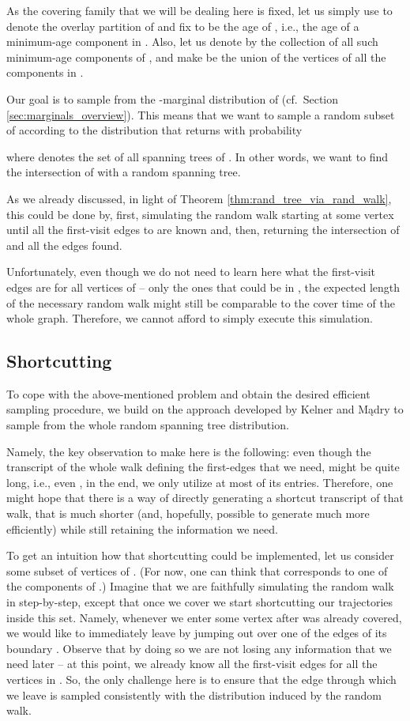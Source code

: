 \documentclass[11pt, letterpaper]{article}
\begin{document}
As the covering family  that we will be dealing here is fixed, let us simply use  to denote the overlay partition  of  and fix  to be the age of , i.e., the age  of a minimum-age component  in . Also, let us denote by  the collection of all such minimum-age components  of , and make  be the union of the vertices of all the components in . 

Our goal is to sample from the -marginal distribution of  (cf.~Section \ref{sec:marginals_overview}). This means that we want to sample a random subset of  according to the distribution that returns  with probability 

where  denotes the set of all spanning trees of . In other words, we want to find the intersection of  with a random spanning tree.

As we already discussed, in light of Theorem \ref{thm:rand_tree_via_rand_walk}, this could be done by, first, simulating the random walk starting at some vertex  until all the first-visit edges  to  are known and, then, returning the intersection  of  and all the edges  found. 

Unfortunately, even though we do not need to learn here what the first-visit edges  are for all vertices of  -- only the ones that could be in , the expected length of the necessary random walk might still be comparable to the cover time of the whole graph. Therefore, we cannot afford to simply execute this simulation. 


\subsection{Shortcutting}\label{sec:shortcutting}
To cope with the above-mentioned problem and obtain the desired efficient sampling procedure, we build on the approach developed by Kelner and Mądry \cite{KelnerM09} to sample from the whole random spanning tree distribution. 

Namely, the key observation to make here is the following: even though the transcript of the whole walk defining the first-edges  that we need, might be quite long, i.e., even , in the end, we only utilize at most  of its entries. Therefore, one might hope that there is a way of directly generating a  shortcut transcript of that walk, that is much shorter (and, hopefully, possible to generate much more efficiently) while still retaining the information we need.

To get an intuition how that shortcutting could be implemented, let us consider some subset  of vertices of . (For now, one can think that  corresponds to one of the components of .) Imagine that we are faithfully simulating the random walk in  step-by-step, except that once we cover  we start shortcutting our trajectories inside this set. Namely, whenever we enter some vertex  after  was already covered, we would like to immediately leave  by jumping out over one of the edges of its boundary . Observe that by doing so we are not losing any information that we need later -- at this point, we already know all the first-visit edges  for all the vertices in . So, the only challenge here is to ensure that the edge through which we leave  is sampled consistently with the distribution induced by the random walk.  
\end{document}
